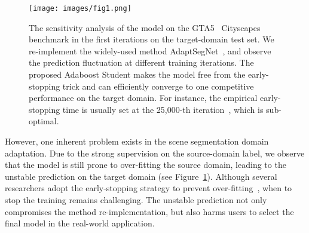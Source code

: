 \documentclass[journal]{IEEEtran}
\begin{document}
\begin{figure}[t]
\begin{center}
\texttt{[image: images/fig1.png]}
\end{center}
\vspace{-.2in}
   \caption{The sensitivity analysis of the model on the GTA5~\cite{richter2016playing}  Cityscapes~\cite{cordts2016cityscapes} benchmark in the first  iterations on the target-domain test set. We re-implement the widely-used method AdaptSegNet~\cite{tsai2018learning}, and observe the prediction fluctuation at different training iterations. The proposed Adaboost Student makes the model free from the early-stopping trick and can efficiently converge to one competitive performance on the target domain. For instance, the empirical early-stopping time is usually set at the 25,000-th iteration~\cite{zheng2019unsupervised}, which is  sub-optimal. }
\label{fig:motivation}
\end{figure}

However, one inherent problem exists in the scene segmentation domain adaptation. Due to the strong supervision on the source-domain label, we observe that the model is still prone to over-fitting the source domain, leading to the unstable prediction on the target domain (see Figure~\ref{fig:motivation}). Although several researchers adopt the early-stopping strategy to prevent over-fitting~\cite{luo2019significance,luo2019taking,zheng2019unsupervised}, when to stop the training remains challenging. 
The unstable prediction not only compromises the method re-implementation, but also harms users to select the final model in the real-world application. 
\end{document}
